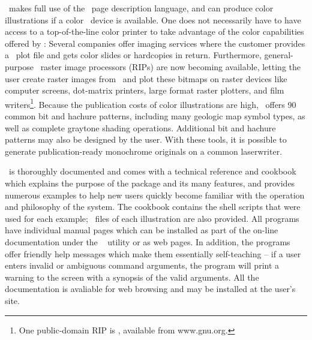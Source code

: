 \GMT\ makes full use of the \PS\ page description language, and can produce color illustrations
if a color \PS\ device is available.  One does not
necessarily have to have access to a top-of-the-line color printer
to take advantage of the color capabilities offered by \GMT: Several
companies offer imaging services where the customer provides a
\PS\ plot file and gets color slides or hardcopies in return.
Furthermore, general-purpose \PS\ raster image processors
(RIPs) are now becoming available, letting the user create raster images
from \PS\ and plot these bitmaps on raster devices like computer
screens, dot-matrix printers, large format raster plotters, and film
writers\footnote{One public-domain RIP is ,
available from www.gnu.org.}.
Because the publication costs of color illustrations are high,
\GMT\ offers 90 common bit and hachure patterns, including many geologic
map symbol types, as well as complete graytone shading operations.
Additional bit and hachure patterns may also be designed by the user.
With these tools, it is possible to generate publication-ready
monochrome originals on a common laserwriter. 

\GMT\ is thoroughly documented and comes with a technical reference and
cookbook which explains the purpose of the package and its many features,
and provides numerous examples to help new users quickly become familiar
with the operation and philosophy of the system.  The cookbook contains
the shell scripts that were used for each example; \PS\
files of each illustration are also provided.  All programs have
individual manual pages which can be installed as part of the on-line
documentation under the \UNIX\ \progname{man} utility or as web pages.  In addition, the
programs offer friendly help messages which make them essentially
self-teaching -- if a user enters invalid or ambiguous command arguments,
the program will print a warning to the screen with a synopsis of the
valid arguments.  All the documentation is avaliable for web browsing
and may be installed at the user's site.


